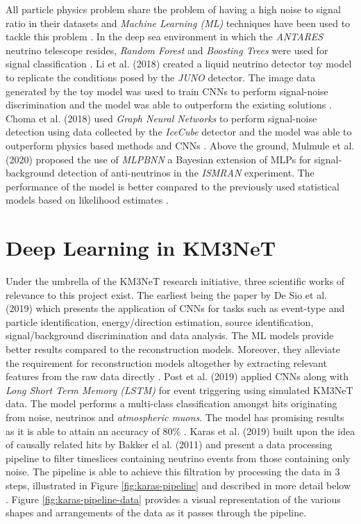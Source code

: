 All particle physics problem share the problem of having a high noise
to signal ratio in their datasets and \emph{Machine Learning (ML)}
techniques have been used to tackle this problem
\cite{mulmule2020machine, li2018deep, choma2018graph, neff2012signal}.
In the deep sea environment in which the \emph{ANTARES} neutrino
telescope resides, \emph{Random Forest} and \emph{Boosting Trees} were
used for signal classification \cite{neff2012signal}. Li et al. (2018)
created a liquid neutrino detector toy model to replicate the
conditions posed by the \emph{JUNO} detector. The image data generated
by the toy model was used to train CNNs to perform signal-noise
discrimination and the model was able to outperform the existing
solutions \cite{li2018deep}. Choma et al. (2018) used \emph{Graph
Neural Networks} to perform signal-noise detection using data
collected by the \emph{IceCube} detector and the model was able to
outperform physics based methods and CNNs \cite{choma2018graph}. Above
the ground, Mulmule et al. (2020) proposed the use of \emph{MLPBNN} a
Bayesian extension of MLPs for signal-background detection of
anti-neutrinos in the \emph{ISMRAN} experiment. The performance of the
model is better compared to the previously used statistical models
based on likelihood estimates \cite{mulmule2020machine}.

\section{Deep Learning in KM3NeT}
\label{sec:dl-km3net}

Under the umbrella of the KM3NeT research initiative, three scientific
works of relevance to this project exist. The earliest being the paper
by De Sio et al. (2019) which presents the application of CNNs for
tasks such as event-type and particle identification, energy/direction
estimation, source identification, signal/background discrimination
and data analysis. The ML models provide better results compared to
the reconstruction models. Moreover, they alleviate the requirement
for reconstruction models altogether by extracting relevant features
from the raw data directly \cite{de2019machine}. Post et al. (2019)
applied CNNs along with \emph{Long Short Term Memory (LSTM)}
\cite{sainath2015convolutional} for event triggering using simulated
KM3NeT data. The model performs a multi-class classification amongst
hits originating from noise, neutrinos and \emph{atmospheric muons}.
The model has promising results as it is able to attain an accuracy of
80\% \cite{post2019km3nnet}. Karas et al. (2019) built upon the idea
of causally related hits by Bakker el al. (2011) and present a data
processing pipeline to filter timeslices containing neutrino events
from those containing only noise. The pipeline is able to achieve this
filtration by processing the data in 3 steps, illustrated in Figure
\ref{fig:karas-pipeline} and described in more detail below
\cite{karas2019data}. Figure \ref{fig:karas-pipeline-data} provides a
visual representation of the various shapes and arrangements of the
data as it passes through the pipeline.

